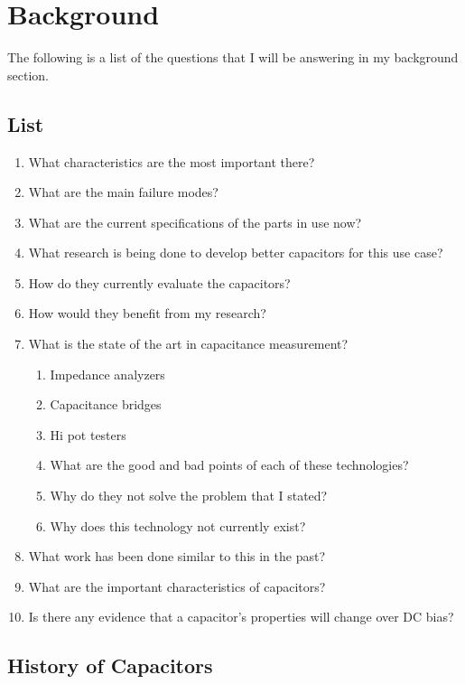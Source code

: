 \section {Background}

The following is a list of the questions that I will be answering in my background section.

\subsection{List}
\begin {enumerate}
    \item What characteristics are the most important there?
    \item What are the main failure modes?
    \item What are the current specifications of the parts in use now?
    \item What research is being done to develop better capacitors for this use case?
    \item How do they currently evaluate the capacitors?
    \item How would they benefit from my research?
    \item What is the state of the art in capacitance measurement?
    \begin {enumerate}
        \item Impedance analyzers
        \item Capacitance bridges
        \item Hi pot testers
        \item What are the good and bad points of each of these technologies?
        \item Why do they not solve the problem that I stated? 
        \item Why does this technology not currently exist?
    \end {enumerate}
    \item What work has been done similar to this in the past?
    \item What are the important characteristics of capacitors?
    \item Is there any evidence that a capacitor's properties will change over DC bias?
\end {enumerate}

\subsection {History of Capacitors}
\label{sec:history}


